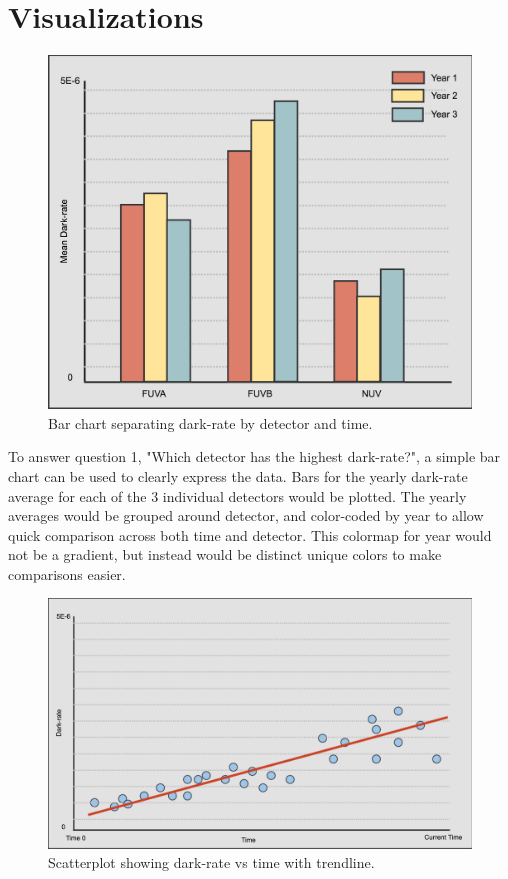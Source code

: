 \documentclass[a4paper,11pt]{article}
\begin{document}
\section{Visualizations}

\begin{figure}[h!]
\caption{Bar chart separating dark-rate by detector and time.} 
\centering
\includegraphics[width=.8\textwidth]{bars.png}
\end{figure}

To answer question 1, "Which detector has the highest dark-rate?", a simple bar chart can be used to clearly express the data.  Bars for the yearly dark-rate average for each of the 3 individual detectors would be plotted.  The yearly averages would be grouped around detector, and color-coded by year to allow quick comparison across both time and detector.  This colormap for year would not be a gradient, but instead would be distinct unique colors to make comparisons easier.  


\begin{figure}[h!]
\caption{Scatterplot showing dark-rate vs time with trendline.} 
\centering
\includegraphics[width=.8\textwidth]{time.png}
\end{figure}
\end{document}
